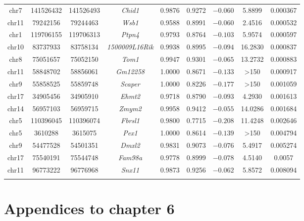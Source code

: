 \begin{table}[!htbp]
\begin{tabular}{@{\extracolsep{5pt}} ccccccccc}
	chr7 & 141526432  & 141526493 & \textit{Chid1} & 0.9876 & 0.9272 & $-0.060$ & 5.8899 & 0.000367 \\ 
	chr11 & 79242156 & 79244463 & \textit{Wsb1} & 0.9588 & 0.8991 & $-0.060$ & 2.4516 & 0.000532 \\ 
	chr1 & 119706155  & 119706313 & \textit{Ptpn4} & 0.9793 & 0.8764 & $-0.103$ & 5.9574 & 0.000597 \\ 
	chr10 & 83737933 & 83758134 & \textit{1500009L16Rik} & 0.9938 & 0.8995 & $-0.094$ & 16.2830 & 0.000837 \\ 
	chr8 & 75051657 & 75052150 & \textit{Tom1} & 0.9947 & 0.9301 & $-0.065$ & 13.2732 & 0.000883 \\ 
	chr11 & 58848702 & 58856061 & \textit{Gm12258} & 1.0000 & 0.8671 & $-0.133$ & \textgreater 150 & 0.000917 \\ 
	chr9 & 55858525 & 55859748 & \textit{Scaper} & 1.0000 & 0.8226 & $-0.177$ & \textgreater 150 & 0.001059 \\ 
	chr17 & 34905456 & 34905910 & \textit{Ehmt2} & 0.9718 & 0.8790 & $-0.093$ & 4.2930 & 0.001613 \\ 
	chr14 & 56957103 & 56959715 & \textit{Zmym2} & 0.9958 & 0.9412 & $-0.055$ & 14.0286 & 0.001684 \\ 
	chr5 & 110396045 & 110396074& \textit{Fbrsl1} & 0.9800 & 0.7715 & $-0.208$ & 11.4248 & 0.002646 \\ 
	chr5 & 3610288 & 3615075 & \textit{Pex1} & 1.0000 & 0.8614 & $-0.139$ & \textgreater 150 & 0.004794 \\ 
	chr9 & 54477528 & 54501351 & \textit{Dmxl2} & 0.9831 & 0.9073 & $-0.076$ & 5.4917 & 0.005274 \\ 
	chr17 & 75540191 & 75544748 & \textit{Fam98a} & 0.9778 & 0.8999 & $-0.078$ & 4.5140 & 0.0057 \\ 
	chr11 & 96773222 & 96776968 & \textit{Snx11} & 0.9873 & 0.9256 & $-0.062$ & 5.8572 & 0.008094 \\ 
	\hline \\[-1.8ex] 
	\end{tabular} 
	\end{table} 
	
\clearpage

\section{Appendices to chapter 6}

